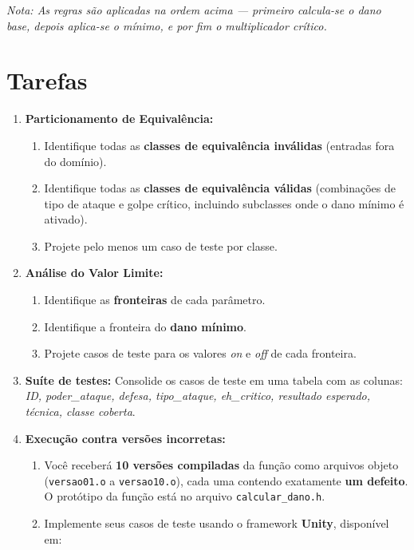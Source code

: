 \documentclass[12pt,a4paper]{article}
\begin{document}
\textit{Nota: As regras são aplicadas na ordem acima --- primeiro calcula-se o dano base, depois aplica-se o mínimo, e por fim o multiplicador crítico.}

\section{Tarefas}

\begin{enumerate}
  \item \textbf{Particionamento de Equivalência:}
  \begin{enumerate}[label=\alph*)]
    \item Identifique todas as \textbf{classes de equivalência inválidas} (entradas fora do domínio).
    \item Identifique todas as \textbf{classes de equivalência válidas} (combinações de tipo de ataque e golpe crítico, incluindo subclasses onde o dano mínimo é ativado).
    \item Projete pelo menos um caso de teste por classe.
  \end{enumerate}

  \item \textbf{Análise do Valor Limite:}
  \begin{enumerate}[label=\alph*)]
    \item Identifique as \textbf{fronteiras} de cada parâmetro.
    \item Identifique a fronteira do \textbf{dano mínimo}.
    \item Projete casos de teste para os valores \textit{on} e \textit{off} de cada fronteira.
  \end{enumerate}

  \item \textbf{Suíte de testes:} Consolide os casos de teste em uma tabela com as colunas: \textit{ID, poder\_ataque, defesa, tipo\_ataque, eh\_critico, resultado esperado, técnica, classe coberta}.

  \item \textbf{Execução contra versões incorretas:}
  \begin{enumerate}[label=\alph*)]
    \item Você receberá \textbf{10 versões compiladas} da função como arquivos objeto (\texttt{versao01.o} a \texttt{versao10.o}), cada uma contendo exatamente \textbf{um defeito}. O protótipo da função está no arquivo \texttt{calcular\_dano.h}.
    \item Implemente seus casos de teste usando o framework \textbf{Unity}, disponível em:


\end{enumerate}
\end{enumerate}
\end{document}
